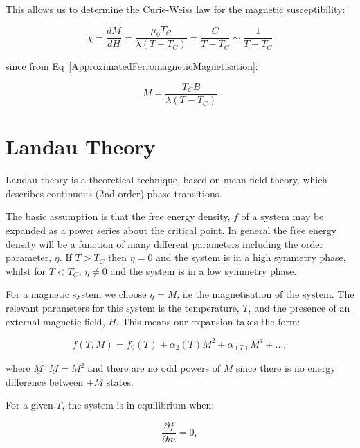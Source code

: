 \noindent This allows us to determine the Curie-Weiss law for the magnetic susceptibility:

\begin{equation}
    \chi = \frac{dM}{dH} = \frac{\mu_0 T_C}{\lambda (T - T_C)} = \frac{C}{T- T_C} \sim \frac{1}{T - T_C}
    \label{CurieWeissLaw}
\end{equation}

\noindent since from Eq~\ref{ApproximatedFerromagneticMagnetisation}:

\begin{equation}
    M = \frac{T_C B}{\lambda (T - T_C)}
\end{equation}

\section{Landau Theory}

Landau theory is a theoretical technique, based on mean field theory, which describes continuous (2nd order) phase transitions.

\noindent The basic assumption is that the free energy density, $f$ of a system may be expanded as a power series about the critical point. In general the free energy density will be a function of many different parameters including the order parameter, $\eta$. If $T > T_C$ then $\eta = 0$ and the system is in a high symmetry phase, whilst for $T < T_C$, $\eta \neq 0$ and the system is in a low symmetry phase.

\noindent For a magnetic system we choose $\eta = M$, i.e the magnetisation of the system. The relevant parameters for this system is the temperature, $T$, and the presence of an external magnetic field, $H$. This means our expansion takes the form:

\begin{equation}
    f(T, M) = f_0(T) + \alpha_2(T) M^2 + \alpha_(T) M^4 + ... ,
    \label{FreeEnergyDensityPowerExpansion}
\end{equation}

\noindent where $\underline{M} \cdot \underline{M} = M^2$ and there are no odd powers of $M$ since there is no energy difference between $\pm M$ states.

\noindent For a given $T$, the system is in equilibrium when:

\begin{equation}
    \frac{\partial f}{\partial m} = 0,
    \label{EquilibriumCondition}
\end{equation}

